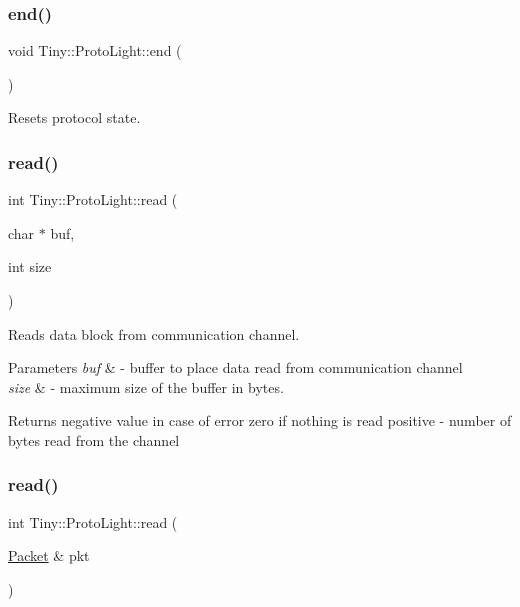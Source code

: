 \subsubsection{\texorpdfstring{end()}{end()}}
{\footnotesize\ttfamily void Tiny\+::\+Proto\+Light\+::end (\begin{DoxyParamCaption}{ }\end{DoxyParamCaption})}

Resets protocol state. \mbox{\label{classTiny_1_1ProtoLight_acf18a8b73ee6c6394270c903ad7882b8}} 
\subsubsection{\texorpdfstring{read()}{read()}\hspace{0.1cm}{\footnotesize\ttfamily [1/2]}}
{\footnotesize\ttfamily int Tiny\+::\+Proto\+Light\+::read (\begin{DoxyParamCaption}\item[{char $\ast$}]{buf,  }\item[{int}]{size }\end{DoxyParamCaption})}

Reads data block from communication channel. 
\begin{DoxyParams}{Parameters}
{\em buf} & -\/ buffer to place data read from communication channel \\
\hline
{\em size} & -\/ maximum size of the buffer in bytes. \\
\hline
\end{DoxyParams}
\begin{DoxyReturn}{Returns}
negative value in case of error zero if nothing is read positive -\/ number of bytes read from the channel 
\end{DoxyReturn}
\mbox{\label{classTiny_1_1ProtoLight_a96c56b10b4eee28c09b291461c66fa54}} 
\subsubsection{\texorpdfstring{read()}{read()}\hspace{0.1cm}{\footnotesize\ttfamily [2/2]}}
{\footnotesize\ttfamily int Tiny\+::\+Proto\+Light\+::read (\begin{DoxyParamCaption}\item[{\hyperlink{classTiny_1_1Packet}{Packet} \&}]{pkt }\end{DoxyParamCaption})}

